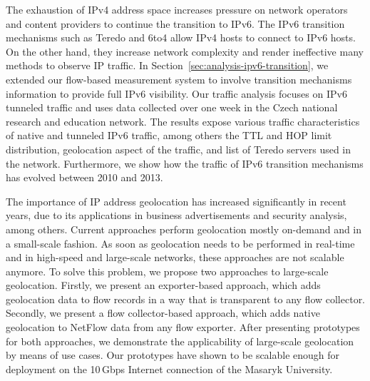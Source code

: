 The exhaustion of IPv4 address space increases pressure on network operators and content providers to continue the transition to IPv6. The IPv6 transition mechanisms such as Teredo and 6to4 allow IPv4 hosts to connect to IPv6 hosts. On the other hand, they increase network complexity and render ineffective many methods to observe IP traffic. In Section~\ref{sec:analysis-ipv6-transition}, we extended our flow-based measurement system to involve transition mechanisms information to provide full IPv6 visibility. Our traffic analysis focuses on IPv6 tunneled traffic and uses data collected over one week in the Czech national research and education network. The results expose various traffic characteristics of native and tunneled IPv6 traffic, among others the TTL and HOP limit distribution, geolocation aspect of the traffic, and list of Teredo servers used in the network. Furthermore, we show how the traffic of IPv6 transition mechanisms has evolved between 2010 and 2013.

The importance of IP address geolocation has increased significantly in recent years, due to its applications in business advertisements and security analysis, among others. Current approaches perform geolocation mostly on-demand and in a small-scale fashion. As soon as geolocation needs to be performed in real-time and in high-speed and large-scale networks, these approaches are not scalable anymore. To solve this problem, we propose two approaches to large-scale geolocation. Firstly, we present an exporter-based approach, which adds geolocation data to flow records in a way that is transparent to any flow collector. Secondly, we present a flow collector-based approach, which adds native geolocation to NetFlow data from any flow exporter. After presenting prototypes for both approaches, we demonstrate the applicability of large-scale geolocation by means of use cases. Our prototypes have shown to be scalable enough for deployment on the 10\,Gbps Internet connection of the Masaryk University.